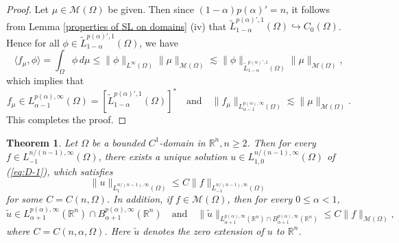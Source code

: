 \documentclass[reqno,centertags,11pt]{amsart}
\newtheorem{thm}{Theorem}
\theoremstyle{definition}
\numberwithin{thm}{section}
\numberwithin{equation}{section}
\newcommand{\R}{{\mathbb{R}}}
\begin{document}
\begin{proof} Let $ \mu\in \mathcal{M}  (\Omega )$ be given.
Then since
$(1-\alpha ) p(\alpha) ' =n$, it follows from Lemma \ref{properties of SL on domains} (iv) that
$
\widetilde{L}_{1-\alpha}^{p(\alpha)',1}(\Omega ) \hookrightarrow C_0 (\Omega )$.
Hence for all $\phi \in \widetilde{L}_{1-\alpha}^{p(\alpha)',1}(\Omega ) $, we have
\[
\langle f_\mu , \phi \rangle = \int_\Omega \phi \, d \mu \le \|\phi \|_{L^\infty (\Omega )}  \|\mu \|_{\mathcal{M}  (\Omega )} \lesssim  \|\phi \|_{\widetilde{L}_{1-\alpha}^{p(\alpha)',1}(\Omega )}  \|\mu \|_{\mathcal{M}  (\Omega )},
\]
which implies that
$$
f_\mu \in L_{\alpha-1}^{p(\alpha),\infty}(\Omega ) = \left[\widetilde{L}_{1-\alpha}^{p(\alpha)',1}(\Omega )\right]^*  \quad\mbox{and}\quad
 \|f_\mu \|_{L_{\alpha-1}^{p(\alpha),\infty}(\Omega )}\lesssim  \|\mu \|_{\mathcal{M}  (\Omega )} .
$$
This completes the proof.
\end{proof}


\begin{thm}\label{Poisson-measure data}
Let $\Omega$ be a bounded $C^1$-domain in $\R^n , n \ge 2 $.
Then for every  $ f\in L_{-1}^{n/(n-1),\infty} (\Omega )$, there exists a unique solution  $u\in L_{1, 0}^{n/(n-1),\infty}(\Omega )$  of (\ref{eq:D-1}), which satisfies
\begin{equation}\label{est-u-L1p}
\|u\|_{L_{1}^{n/(n-1),\infty}(\Omega )}  \le C \|f \|_{L_{-1}^{n/(n-1),\infty} (\Omega )}
\end{equation}
for some $C=C(n,\Omega )$. In addition, if $ f\in \mathcal{M}  (\Omega )$, then for every $0 \le   \alpha <1$,
\[
\widetilde{u}  \in L_{\alpha+1}^{p(\alpha) ,\infty}(\R^n  )\cap B_{\alpha+1}^{p(\alpha) ,\infty}(\R^n  ) \quad\mbox{and}\quad  \|\widetilde{u}  \|_{L_{\alpha+1}^{p(\alpha),\infty}(\R^n )\cap B_{\alpha+1}^{p(\alpha),\infty}(\R^n )} \le C \|f \|_{\mathcal{M}  (\Omega )},
\]
where  $C=C(n,\alpha ,  \Omega )$. Here $\widetilde{u}$ denotes the zero extension of $u$ to $\R^n$.
\end{thm}
\end{document}
